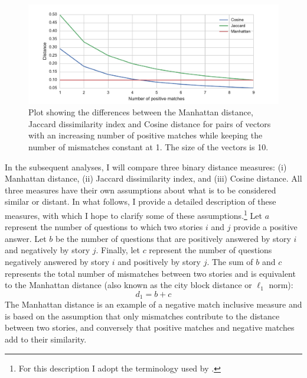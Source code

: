 \begin{figure}
\centering
\includegraphics[width=\textwidth]{images/mismatches}
\caption{Plot showing the differences between the Manhattan distance, Jaccard dissimilarity index and Cosine distance for pairs of vectors with an increasing number of positive matches while keeping the number of mismatches constant at 1. The size of the vectors is 10.}
\label{fig:mismatches}
\end{figure}

In the subsequent analyses, I will compare three binary distance measures: (i) Manhattan distance, (ii) Jaccard dissimilarity index, and (iii) Cosine distance. All three measures have their own assumptions about what is to be considered similar or distant. In what follows, I provide a detailed description of these measures, with which I hope to clarify some of these assumptions.\footnote{For this description I adopt the terminology used by \autocite{choi:2010}.} Let $a$ represent the number of questions to which two stories $i$ and $j$ provide a positive answer. Let $b$ be the number of questions that are positively answered by story $i$ and negatively by story $j$. Finally, let $c$ represent the number of questions negatively answered by story $i$ and positively by story $j$. The sum of $b$ and $c$ represents the total number of mismatches between two stories and is equivalent to the Manhattan distance (also known as the city block distance or $\ell_1$ norm):
\begin{equation}
d_1 = b + c
\end{equation}
The Manhattan distance is an example of a negative match inclusive measure and is based on the assumption that only mismatches contribute to the distance between two stories, and conversely that positive matches and negative matches add to their similarity. 

